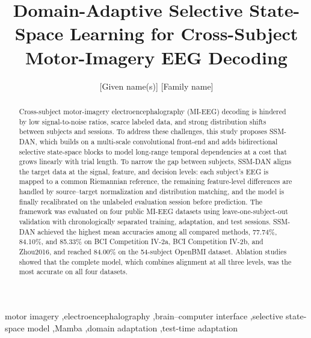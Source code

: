 \documentclass[preprint,12pt]{elsarticle}
\begin{document}
\begin{frontmatter}

\title{Domain-Adaptive Selective State-Space Learning for Cross-Subject Motor-Imagery EEG Decoding}

\author[aff1]{[Given name(s)] [Family name]}


\begin{abstract}
Cross-subject motor-imagery electroencephalography (MI-EEG) decoding is hindered by low signal-to-noise ratios, scarce labeled data, and strong distribution shifts between subjects and sessions. To address these challenges, this study proposes SSM-DAN, which builds on a multi-scale convolutional front-end and adds bidirectional selective state-space blocks to model long-range temporal dependencies at a cost that grows linearly with trial length. To narrow the gap between subjects, SSM-DAN aligns the target data at the signal, feature, and decision levels: each subject's EEG is mapped to a common Riemannian reference, the remaining feature-level differences are handled by source--target normalization and distribution matching, and the model is finally recalibrated on the unlabeled evaluation session before prediction. The framework was evaluated on four public MI-EEG datasets using leave-one-subject-out validation with chronologically separated training, adaptation, and test sessions. SSM-DAN achieved the highest mean accuracies among all compared methods, 77.74\%, 84.10\%, and 85.33\% on BCI Competition IV-2a, BCI Competition IV-2b, and Zhou2016, and reached 84.00\% on the 54-subject OpenBMI dataset. Ablation studies showed that the complete model, which combines alignment at all three levels, was the most accurate on all four datasets.
\end{abstract}

\begin{keyword}
motor imagery \sep electroencephalography \sep brain--computer interface \sep selective state-space model \sep Mamba \sep domain adaptation \sep test-time adaptation
\end{keyword}

\end{frontmatter}
\end{document}
